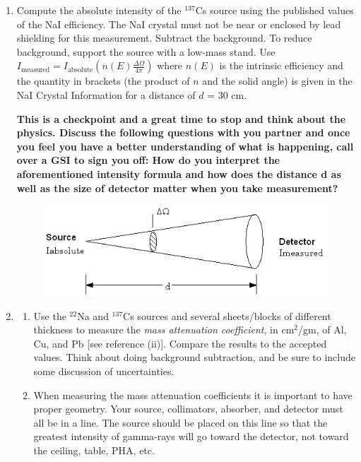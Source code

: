 \documentclass{../lab}
\begin{document}
\begin{enumerate}
    \item Compute the absolute intensity of the $^{137}$Cs source using the published values of the NaI efficiency. The NaI crystal must not be near or enclosed by lead shielding for this measurement. Subtract the background. To reduce background, support the source with a low-mass stand. Use $I_\textrm{measured} = I_\textrm{absolute} (n(E)\frac{\Delta\Omega}{4\pi})$ where $n(E)$ is the intrinsic efficiency and the quantity in brackets (the product of $n$ and the solid angle) is given in the NaI Crystal Information for a distance of $d$ = 30 cm.
    
    \textbf{This is a checkpoint and a great time to stop and think about the physics. Discuss the following questions with you partner and once you feel you have a better understanding of what is happening, call over a GSI to sign you off: How do you interpret the aforementioned intensity formula and how does the distance d as well as the size of detector matter when you take measurement?}

    \begin{figure}[h]
        \centering
        \href{http://experimentationlab.berkeley.edu/sites/default/files/images/GMAimage007.gif}{\includegraphics[width=0.8\linewidth]{images/GMAimage007.png}}
        \label{fig:GMAimage007}
    \end{figure}

    \item \begin{enumerate}
        \item Use the $^{22}$Na and $^{137}$Cs sources and several sheets/blocks of different thickness to measure the \emph{mass attenuation coefficient}, in cm$^2$/gm, of Al, Cu, and Pb [see reference (ii)]. Compare the results to the accepted values. Think about doing background subtraction, and be sure to include some discussion of uncertainties.

        \item When measuring the mass attenuation coefficients it is important to have proper geometry. Your source, collimators, absorber, and detector must all be in a line. The source should be placed on this line so that the greatest intensity of gamma-rays will go toward the detector, not toward the ceiling, table, PHA, etc.


\end{enumerate}
\end{enumerate}
\end{document}
